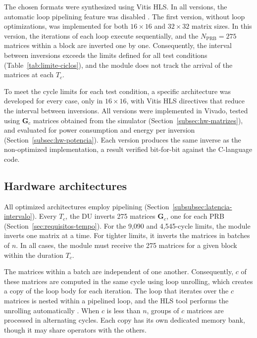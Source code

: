 The chosen formats were synthesized using Vitis HLS. In all versions, the automatic loop pipelining feature was disabled \cite[p.~42]{ug1399}. The first version, without loop optimizations, was implemented for both $16 \times 16$ and $32 \times 32$ matrix sizes. In this version, the iterations of each loop execute sequentially, and the $N_{\text{PRB}} = 275$ matrices within a block are inverted one by one. Consequently, the interval between inversions exceeds the limits defined for all test conditions (Table~\ref{tab:limite-ciclos}), and the module does not track the arrival of the matrices at each $T_c$.

To meet the cycle limits for each test condition, a specific architecture was developed for every case, only in $16 \times 16$, with Vitis HLS directives that reduce the interval between inversions. All versions were implemented in Vivado, tested using $\mathbf G_c$ matrices obtained from the simulator (Section~\ref{subsec:hw-matrizes}), and evaluated for power consumption and energy per inversion (Section~\ref{subsec:hw-potencia}). Each version produces the same inverse as the non-optimized implementation, a result verified bit-for-bit against the C-language code.

\subsection{\texorpdfstring{Hardware architectures}{Hardware architectures}}\label{subsec:hw-arquiteturas}
All optimized architectures employ pipelining (Section~\ref{subsubsec:latencia-intervalo}). Every $T_c$, the DU inverts 275 matrices $\mathbf G_c$, one for each PRB (Section~\ref{sec:requisitos-tempo}). For the 9,090 and 4,545-cycle limits, the module inverts one matrix at a time. For tighter limits, it inverts the matrices in batches of $n$. In all cases, the module must receive the 275 matrices for a given block within the duration $T_c$.

The matrices within a batch are independent of one another. Consequently, $c$ of these matrices are computed in the same cycle using loop unrolling, which creates a copy of the loop body for each iteration. The loop that iterates over the $c$ matrices is nested within a pipelined loop, and the HLS tool performs the unrolling automatically \cite[pp.~41, 372, and 428]{ug1399}. When $c$ is less than $n$, groups of $c$ matrices are processed in alternating cycles. Each copy has its own dedicated memory bank, though it may share operators with the others.

